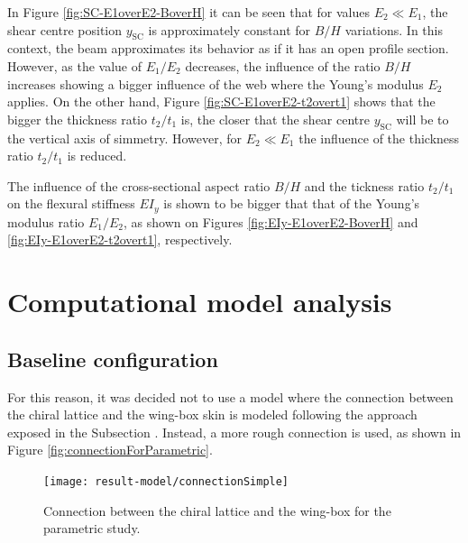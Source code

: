 In Figure \ref{fig:SC-E1overE2-BoverH} it can be seen that for values $E_2 \ll E_1$, the shear centre position $y_{\mathrm{SC}}$ is approximately constant for $B/H$ variations. In this context, the beam approximates its behavior as if it has an open profile section. However, as the value of $E_1/E_2$ decreases, the influence of the ratio $B/H$ increases showing a bigger influence of the web where the Young's modulus $E_2$ applies. On the other hand, Figure \ref{fig:SC-E1overE2-t2overt1} shows that the bigger the thickness ratio $t_2/t_1$ is, the closer that the shear centre $y_{\mathrm{SC}}$ will be to the vertical axis of simmetry. However, for $E_2 \ll E_1$ the influence of the thickness ratio $t_2/t_1$ is reduced.

The influence of the cross-sectional aspect ratio $B/H$ and the tickness ratio $t_2/t_1$ on the flexural stiffness $E I_y$ is shown to be bigger that that of the Young's modulus ratio $E_1/E_2$, as shown on Figures \ref{fig:EIy-E1overE2-BoverH} and \ref{fig:EIy-E1overE2-t2overt1}, respectively.



\section{Computational model analysis} \label{sec:computationalModelAnalysis_results_model}

\subsection{Baseline configuration} \label{subsec:baselineConfig_results_model}

  For this reason, it was decided not to use a model where the connection between the chiral lattice and the wing-box skin is modeled following the approach exposed in the Subsection \label{subsec:connections_computationalModel}. Instead, a more rough connection is used, as shown in Figure \ref{fig:connectionForParametric}.

  \begin{figure}[!htpb]
    \centering
    \texttt{[image: result-model/connectionSimple]}
    \caption[Connection between the chiral lattice and the wing-box for the parametric study]{Connection between the chiral lattice and the wing-box for the parametric study.}\label{fig:connectionSimple}
  \end{figure}

